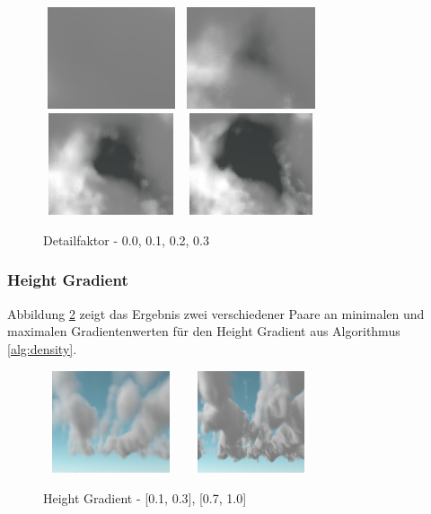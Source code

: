 \begin{figure}[H]
    \centering
    \includegraphics[width=4cm, height=3cm]{media/detail-factor-0.0.png}
    \includegraphics[width=4cm, height=3cm]{media/detail-factor-0.1.png}
    \includegraphics[width=4cm, height=3cm]{media/detail-factor-0.2.png}
    \includegraphics[width=4cm, height=3cm]{media/detail-factor-0.3.png}
    \caption{Detailfaktor - 0.0, 0.1, 0.2, 0.3}
    \label{fig:detail-factor}
\end{figure}

\subsubsection{Height Gradient}
Abbildung \ref{fig:height-gradient} zeigt das Ergebnis zwei verschiedener Paare an minimalen und maximalen Gradientenwerten für den Height Gradient aus Algorithmus \ref{alg:density}.

\begin{figure}[H]
    \centering
    \includegraphics[width=4cm, height=3cm]{media/hg-low.png}
    \includegraphics[width=4cm, height=3cm]{media/hg-high.png}
    \caption{Height Gradient - [0.1, 0.3], [0.7, 1.0]}
    \label{fig:height-gradient}
\end{figure}

